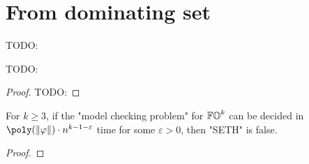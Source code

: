 \section{From dominating set}\label{sect: from dominating set}

\begin{yoshiki}
    TODO:
\end{yoshiki}

\begin{proposition}\label{proposition: SETH dominating set}
    TODO:
\end{proposition}
\begin{proof}
    TODO:
\end{proof}

\begin{corollary}\label{corollary: SETH dominating set}
    For $k \ge 3$,
    if the "model checking problem" for $\mathbb{FO}^{k}$  can be decided in $\poly(\len{\fml}) \cdot n^{k - 1 - \varepsilon}$ time for some $\varepsilon > 0$,
    then "SETH" is false.
\end{corollary}
\begin{proof}
\end{proof}

\cite{williamsFasterDecisionFirstorder2014}



